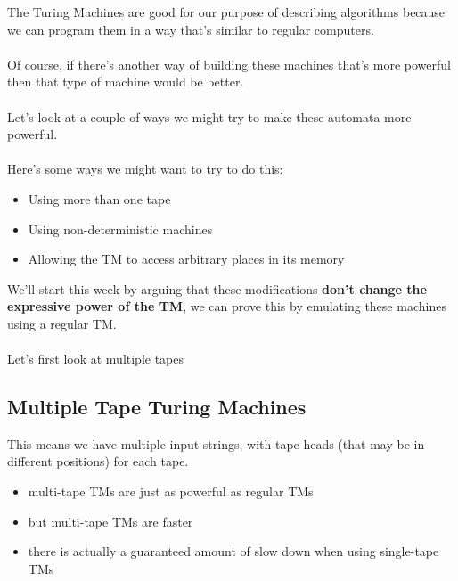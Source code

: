 \documentclass[12pt]{article}
\begin{document}
The Turing Machines are good for our purpose of describing algorithms because we can program them in a way that's similar to regular computers.
\\
\\
Of course, if there's another way of building these machines that's more powerful then that type of machine would be better.
\\
\\
Let's look at a couple of ways we might try to make these automata more powerful.
\\
\\
Here's some ways we might want to try to do this:
\begin{itemize}
    \item Using more than one tape
    \item Using non-deterministic machines
    \item Allowing the TM to access arbitrary places in its memory
\end{itemize}

We'll start this week by arguing that these modifications \textbf{don't change the expressive power of the TM}, we can prove this by emulating these machines using a regular TM.
\\
\\
Let's first look at multiple tapes

\subsection{Multiple Tape Turing Machines}

This means we have multiple input strings, with tape heads (that may be in different positions) for each tape.
\begin{itemize}
    \item multi-tape TMs are just as powerful as regular TMs
    \item but multi-tape TMs are faster
    \item there is actually a guaranteed amount of slow down when using single-tape TMs
\end{itemize}
\end{document}
